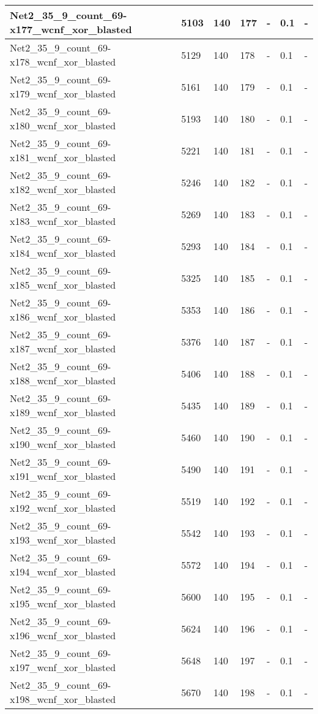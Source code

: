 \begin{scriptsize}
\begin{longtable}{|p{5cm}|l|l|l|l|l|l|}
Net2\_35\_9\_count\_69-x177\_wcnf\_xor\_blasted&5103&140&177&-&0.1&- \\ \hline 
Net2\_35\_9\_count\_69-x178\_wcnf\_xor\_blasted&5129&140&178&-&0.1&- \\ \hline 
Net2\_35\_9\_count\_69-x179\_wcnf\_xor\_blasted&5161&140&179&-&0.1&- \\ \hline 
Net2\_35\_9\_count\_69-x180\_wcnf\_xor\_blasted&5193&140&180&-&0.1&- \\ \hline 
Net2\_35\_9\_count\_69-x181\_wcnf\_xor\_blasted&5221&140&181&-&0.1&- \\ \hline 
Net2\_35\_9\_count\_69-x182\_wcnf\_xor\_blasted&5246&140&182&-&0.1&- \\ \hline 
Net2\_35\_9\_count\_69-x183\_wcnf\_xor\_blasted&5269&140&183&-&0.1&- \\ \hline 
Net2\_35\_9\_count\_69-x184\_wcnf\_xor\_blasted&5293&140&184&-&0.1&- \\ \hline 
Net2\_35\_9\_count\_69-x185\_wcnf\_xor\_blasted&5325&140&185&-&0.1&- \\ \hline 
Net2\_35\_9\_count\_69-x186\_wcnf\_xor\_blasted&5353&140&186&-&0.1&- \\ \hline 
Net2\_35\_9\_count\_69-x187\_wcnf\_xor\_blasted&5376&140&187&-&0.1&- \\ \hline 
Net2\_35\_9\_count\_69-x188\_wcnf\_xor\_blasted&5406&140&188&-&0.1&- \\ \hline 
Net2\_35\_9\_count\_69-x189\_wcnf\_xor\_blasted&5435&140&189&-&0.1&- \\ \hline 
Net2\_35\_9\_count\_69-x190\_wcnf\_xor\_blasted&5460&140&190&-&0.1&- \\ \hline 
Net2\_35\_9\_count\_69-x191\_wcnf\_xor\_blasted&5490&140&191&-&0.1&- \\ \hline 
Net2\_35\_9\_count\_69-x192\_wcnf\_xor\_blasted&5519&140&192&-&0.1&- \\ \hline 
Net2\_35\_9\_count\_69-x193\_wcnf\_xor\_blasted&5542&140&193&-&0.1&- \\ \hline 
Net2\_35\_9\_count\_69-x194\_wcnf\_xor\_blasted&5572&140&194&-&0.1&- \\ \hline 
Net2\_35\_9\_count\_69-x195\_wcnf\_xor\_blasted&5600&140&195&-&0.1&- \\ \hline 
Net2\_35\_9\_count\_69-x196\_wcnf\_xor\_blasted&5624&140&196&-&0.1&- \\ \hline 
Net2\_35\_9\_count\_69-x197\_wcnf\_xor\_blasted&5648&140&197&-&0.1&- \\ \hline 
Net2\_35\_9\_count\_69-x198\_wcnf\_xor\_blasted&5670&140&198&-&0.1&- \\ \hline 

\end{longtable}
\end{scriptsize}
